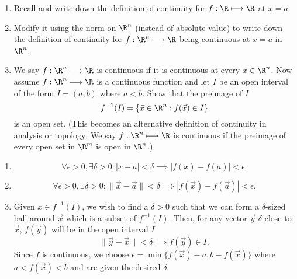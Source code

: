 \documentclass{article}
\begin{document}
\begin{enumerate}[label=(\alph*)]
    \item Recall and write down the definition of continuity for $f:\R\longmapsto\R$ at $x=a$. 
    \item Modify it using the norm on $\R^n$ (instead of absolute value) to write down the definition of continuity for $f:\R^n\longmapsto\R$ being continuous at $x=a$ in $\R^n$.
    \item We say $f:\R^{n}\longmapsto\R$ is continuous if it is continuous at every $x\in \R^n$. Now assume $f:\R^n\longmapsto\R$ is a continuous function and let $I$ be an open interval of the form  $I=(a,b)$ where  $a<b$. Show that the preimage of  $I$  \[
    f^{-1}(I)=\left\{ \vec{x}\in \R^n : f(\vec{x})\in I \right\} 
    \] 
    is an open set. 
    (This becomes an alternative definition of continuity in analysis or topology: We say $f:\R^n\longmapsto\R$ is continuous if the preimage of every open set in $\R^m$ is open in $\R^n$.)
  \end{enumerate}

  \begin{enumerate}[label=(\alph*)]
    \item \[
    \forall \epsilon>0, \exists \delta>0 : |x-a|<\delta \implies |f(x)-f(a)| < \epsilon
    .\] 
  \item \[
    \forall \epsilon>0, \exists \delta>0 : \|\vec{x}-\vec{a}\|<\delta \implies |f(\vec{x})-f(\vec{a})| < \epsilon
  .\]  
  \item Given $x\in f^{-1}(I)$, we wish to find a $\delta>0$ such that we can form a $\delta$-sized ball around $\vec{x}$ which is a subset of $f^{-1}(I)$. 
  Then, for any vector $\vec{y}$ $\delta$-close to $\vec{x}$, $f(\vec{y})$ will be in the open interval $I$ \[
  \|\vec{y}-\vec{x}\|<\delta \implies f(\vec{y})\in I
  .\] 
  Since $f$ is continuous, we choose $\epsilon=\min\{f(\vec{x})-a,b-f(\vec{x})\}$ where $a<f(\vec{x})<b$ and are given the desired $\delta$.
  \end{enumerate}
\end{document}
